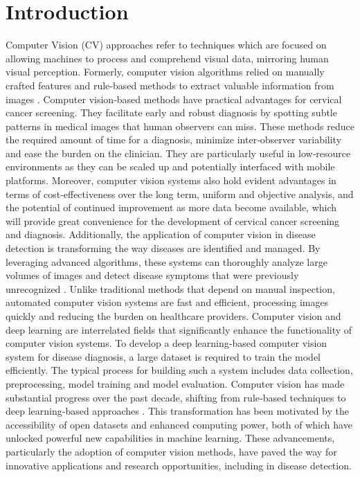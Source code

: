 \documentclass[final,5p,times,twocolumn,authoryear]{elsarticle}
\begin{document}
\section{Introduction}
Computer Vision (CV) approaches refer to techniques which are focused on allowing machines to process and comprehend visual data, mirroring human visual perception. Formerly, computer vision algorithms relied on manually crafted features and rule‑based methods to extract valuable information from images \cite{ref11}. Computer vision‑based methods have practical advantages for cervical cancer screening. They facilitate early and robust diagnosis by spotting subtle patterns in medical images that human observers can miss. These methods reduce the required amount of time for a diagnosis, minimize inter‑observer variability and ease the burden on the clinician. They are particularly useful in low‑resource environments as they can be scaled up and potentially interfaced with mobile platforms. Moreover, computer vision systems also hold evident advantages in terms of cost‑effectiveness over the long term, uniform and objective analysis, and the potential of continued improvement as more data become available, which will provide great convenience for the development of cervical cancer screening and diagnosis.
Additionally, the application of computer vision in disease detection is transforming the way diseases are identified and managed. By leveraging advanced algorithms, these systems can thoroughly analyze large volumes of images and detect disease symptoms that were previously unrecognized \cite{ref12}. Unlike traditional methods that depend on manual inspection, automated computer vision systems are fast and efficient, processing images quickly and reducing the burden on healthcare providers. Computer vision and deep learning are interrelated fields that significantly enhance the functionality of computer vision systems. To develop a deep learning‑based computer vision system for disease diagnosis, a large dataset is required to train the model efficiently. The typical process for building such a system includes data collection, preprocessing, model training and model evaluation. Computer vision has made substantial progress over the past decade, shifting from rule‑based techniques to deep learning‑based approaches \cite{ref13}. This transformation has been motivated by the accessibility of open datasets and enhanced computing power, both of which have unlocked powerful new capabilities in machine learning. These advancements, particularly the adoption of computer vision methods, have paved the way for innovative applications and research opportunities, including in disease detection.
\end{document}
